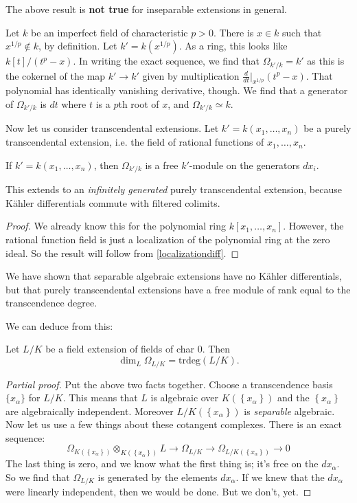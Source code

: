 \begin{remark} 
The above result is \textbf{not true} for inseparable extensions in general. 
\end{remark} 
\begin{example} 
Let $k$ be an imperfect field of characteristic $p>0$. There is $x \in k$ such
that $x^{1/p} \notin k$, by definition. Let $k' = k(x^{1/p})$. As a ring, this
looks like
$k[t]/(t^p - x)$. In writing the exact sequence, we find that $\Omega_{k'/k} =
k'$ as this is the cokernel of the map $k' \to k'$ given by multiplication
$\frac{d}{dt}|_{x^{1/p}} (t^p - x)$. That polynomial has identically vanishing
derivative, though. We find that a generator of $\Omega_{k'/k}$ is $dt$ where
$t$ is a $p$th root of $x$, and $\Omega_{k'/k } \simeq k$.
\end{example} 

Now let us consider transcendental extensions. Let $k' = k(x_1, \dots, x_n)$ be
a purely transcendental extension, i.e. the field of rational functions of
$x_1, \dots, x_n$.

\begin{proposition} 
If $k' = k(x_1, \dots, x_n)$, then $\Omega_{k'/k}$ is a free $k'$-module on the
generators $dx_i$.
\end{proposition} 
This extends to an \emph{infinitely generated} purely transcendental extension,
because K\"ahler differentials commute with filtered colimits. 
\begin{proof} 
We already know this for the polynomial ring $k[x_1, \dots, x_n]$. However, the
rational function field is just a localization of the polynomial ring at the
zero ideal.  So the result will follow from \cref{localizationdiff}.
\end{proof} 

We have shown that separable algebraic extensions have no K\"ahler
differentials, but that purely transcendental extensions have a free module of
rank equal to the transcendence degree.

We can deduce from this:
\begin{corollary} 
Let $L/K$ be a field extension of fields of char 0. Then 
\[ \dim_L \Omega_{L/K} = \mathrm{trdeg}(L/K).  \]
\end{corollary} 
\begin{proof}[Partial proof] 
Put the above two facts together. Choose a transcendence basis $\{x_\alpha\}$
for $L/K$. This means that $L$ is algebraic over $K(\left\{x_\alpha\right\})$
and the $\left\{x_\alpha\right\}$ are algebraically independent.
Moreover $L/K(\left\{x_\alpha\right\})$ is \emph{separable} algebraic.  Now let
us use a few things about these cotangent complexes. There is an exact sequence:
\[ \Omega_{K(\left\{x_\alpha\right\})}
\otimes_{K(\left\{x_\alpha\right\})} L \to \Omega_{L/K} \to \Omega_{L/K(\left\{x_\alpha\right\})}  \to 0 \]
The last thing is zero, and we know what the first thing is; it's free on the
$dx_\alpha$. So we find that $\Omega_{L/K}$ is generated by
the elements $dx_\alpha$. If we knew that the $dx_\alpha$ were linearly
independent, then we would be done. But we don't, yet. 
\end{proof}

